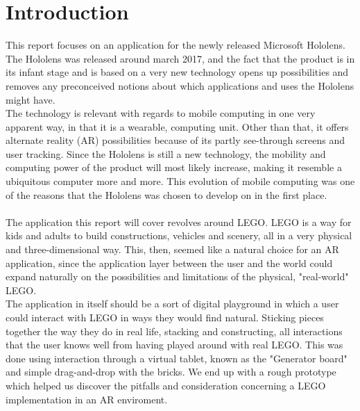 
\section{Introduction}
This report focuses on an application for the newly released Microsoft Hololens. The Hololens was released around march 2017, and the fact that the product is in its infant stage and is based on a very new technology opens up possibilities and removes any preconceived notions about which applications and uses the Hololens might have.\\
The technology is relevant with regards to mobile computing in one very apparent way, in that it is a wearable, computing unit. Other than that, it offers alternate reality (AR) possibilities because of its partly see-through screens and user tracking. Since the Hololens is still a new technology, the mobility and computing power of the product will most likely increase, making it resemble a ubiquitous computer more and more. This evolution of mobile computing was one of the reasons that the Hololens was chosen to develop on in the first place.\\\\
The application this report will cover revolves around LEGO. LEGO is a way for kids and adults to build constructions, vehicles and scenery, all in a very physical and three-dimensional way. This, then, seemed like a natural choice for an AR application, since the application layer between the user and the world could expand naturally on the possibilities and limitations of the physical, "real-world" LEGO.\\
The application in itself should be a sort of digital playground in which a user could interact with LEGO in ways they would find natural. Sticking pieces together the way they do in real life, stacking and constructing, all interactions that the user knows well from having played around with real LEGO. This was done using interaction through a virtual tablet, known as the "Generator board" and simple drag-and-drop with the bricks. We end up with a rough prototype which helped us discover the pitfalls and consideration concerning a LEGO implementation in an AR enviroment. 